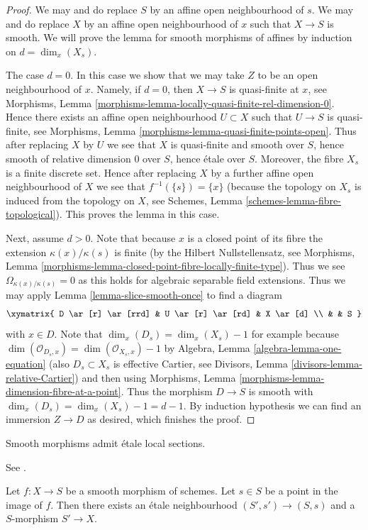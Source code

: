 \begin{proof}
We may and do replace $S$ by an affine open neighbourhood of $s$.
We may and do replace $X$ by an affine open neighbourhood of $x$
such that $X \to S$ is smooth.
We will prove the lemma for smooth morphisms of affines
by induction on $d = \dim_x(X_s)$.

\medskip\noindent
The case $d = 0$. In this case we show that we may take $Z$ to be
an open neighbourhood of $x$. Namely, if $d = 0$, then $X \to S$
is quasi-finite at $x$, see
Morphisms, Lemma \ref{morphisms-lemma-locally-quasi-finite-rel-dimension-0}.
Hence there exists an affine open neighbourhood $U \subset X$ such
that $U \to S$ is quasi-finite, see
Morphisms, Lemma \ref{morphisms-lemma-quasi-finite-points-open}.
Thus after replacing $X$ by $U$ we see that
$X$ is quasi-finite and smooth over $S$, hence
smooth of relative dimension $0$ over $S$, hence
\'etale over $S$. Moreover, the fibre $X_s$ is a finite
discrete set. Hence after replacing $X$ by a further affine open neighbourhood
of $X$ we see that $f^{-1}(\{s\}) = \{x\}$ (because the topology
on $X_s$ is induced from the topology on $X$, see
Schemes, Lemma \ref{schemes-lemma-fibre-topological}).
This proves the lemma in this case.

\medskip\noindent
Next, assume $d > 0$. Note that because $x$ is a closed point of its
fibre the extension $\kappa(x)/\kappa(s)$ is finite (by the
Hilbert Nullstellensatz, see
Morphisms, Lemma \ref{morphisms-lemma-closed-point-fibre-locally-finite-type}).
Thus we see $\Omega_{\kappa(x)/\kappa(s)} = 0$ as this holds for
algebraic separable field extensions.
Thus we may apply
Lemma \ref{lemma-slice-smooth-once}
to find a diagram
$$
\xymatrix{
D \ar[r] \ar[rrd] & U \ar[r] \ar[rd] & X \ar[d] \\
& & S
}
$$
with $x \in D$. Note that
$\dim_x(D_s) = \dim_x(X_s) - 1$ for example because
$\dim(\mathcal{O}_{D_s, x}) = \dim(\mathcal{O}_{X_s, x}) - 1$ by
Algebra, Lemma \ref{algebra-lemma-one-equation}
(also $D_s \subset X_s$ is effective Cartier, see
Divisors, Lemma \ref{divisors-lemma-relative-Cartier})
and then using
Morphisms, Lemma \ref{morphisms-lemma-dimension-fibre-at-a-point}.
Thus the morphism $D \to S$ is smooth with
$\dim_x(D_s) = \dim_x(X_s) - 1 = d - 1$. By induction hypothesis
we can find an immersion $Z \to D$ as desired, which finishes the proof.
\end{proof}

\begin{lemma}
\label{lemma-etale-nbhd-dominates-smooth}
\begin{slogan}
Smooth morphisms admit \'etale local sections.
\end{slogan}
\begin{reference}
See \cite[Corollaire 17.16.3 (ii)]{EGA4}.
\end{reference}
Let $f : X \to S$ be a smooth morphism of schemes.
Let $s \in S$ be a point in the image of $f$.
Then there exists an \'etale neighbourhood $(S', s') \to (S, s)$
and a $S$-morphism $S' \to X$.
\end{lemma}

